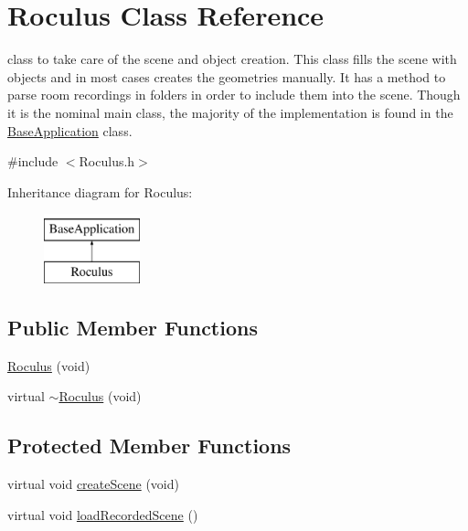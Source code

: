 \hypertarget{classRoculus}{\section{\-Roculus \-Class \-Reference}
\label{classRoculus}
}


class to take care of the scene and object creation. \-This class fills the scene with objects and in most cases creates the geometries manually. \-It has a method to parse room recordings in folders in order to include them into the scene. \-Though it is the nominal main class, the majority of the implementation is found in the \hyperlink{classBaseApplication}{\-Base\-Application} class.  




{\ttfamily \#include $<$\-Roculus.\-h$>$}

\-Inheritance diagram for \-Roculus\-:\begin{figure}[H]
\begin{center}
\leavevmode
\includegraphics[height=2.000000cm]{classRoculus}
\end{center}
\end{figure}
\subsection*{\-Public \-Member \-Functions}
\begin{DoxyCompactItemize}
\item 
\hyperlink{classRoculus_a73729ed3b3134557e18df7b67b4171c5}{\-Roculus} (void)
\item 
virtual \hyperlink{classRoculus_aa839f9c21064f6a6f59e1a6e60afdef9}{$\sim$\-Roculus} (void)
\end{DoxyCompactItemize}
\subsection*{\-Protected \-Member \-Functions}
\begin{DoxyCompactItemize}
\item 
virtual void \hyperlink{classRoculus_a2da8d57d448a37e544d86d51e610f9d6}{create\-Scene} (void)
\item 
virtual void \hyperlink{classRoculus_a47dc1fd07bd9cd79b2f4cb8b95e53a5a}{load\-Recorded\-Scene} ()
\end{DoxyCompactItemize}


